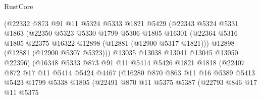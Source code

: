 \begin{lexlean}{RustCore}
\begin{coremodule}
                        (@22332
                          @873
                          @91
                          @11
                          @5324
                          @5333
                          @1821
                          @5429
                          (@22343
                            @5324
                            @5331
                            @1863
                            (@22350
                              @5323
                              @5330
                              @1799
                              @5306
                              @1805
                              @16301
                              (@22364
                                @5316
                                @1805
                                @22375
                                @16322
                                @12898
                                (@12881 (@12900 @5317 @1821)))
                              @12898
                              (@12881 (@12900 @5307 @5323)))
                            @13035
                            @13038
                            @13041
                            @13045
                            @13050
                            @22396)
                          (@16348
                            @5333
                            @873
                            @91
                            @11
                            @5414
                            @5426
                            @1821
                            @1818
                            (@22407
                              @872
                              @17
                              @11
                              @5414
                              @5424
                              @4467
                              (@16280
                                @870
                                @863
                                @11
                                @16
                                @5389
                                @5413
                                @5423
                                @1799
                                @5338
                                @1805
                                (@22491
                                  @870
                                  @11
                                  @5375
                                  @5387
                                  (@22793
                                    @846
                                    @17
                                    @11
                                    @5375

\end{coremodule}
\end{lexlean}
